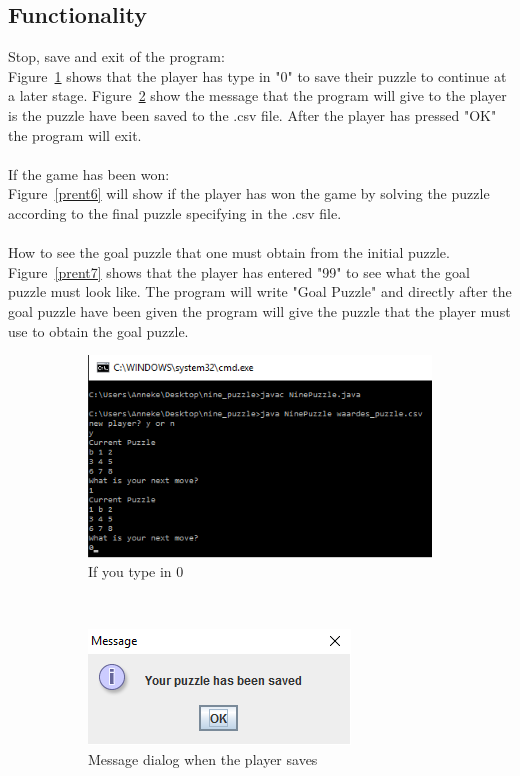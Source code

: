 \documentclass[10pt]{article}
\begin{document}
\subsection{Functionality}
Stop, save and exit of the program:
\\ Figure~\ref{prent4} shows that the player has type in "0" to save their puzzle to continue at a later stage.
Figure~\ref{prent5} show the message that the program will give to the player is the puzzle have been saved to the .csv file.  After the player has pressed "OK" the program will exit.
\\
\\If the game has been won:
\\Figure~\ref{prent6} will show if the player has won the game by solving the puzzle according to the final puzzle specifying in the .csv file.
\\
\\How to see the goal puzzle that one must obtain from the initial puzzle.
\\Figure~\ref{prent7} shows that the player has entered "99" to see what the goal puzzle must look like.  The program will write "Goal Puzzle" and directly after the goal puzzle have been given the program will give the puzzle that the player must use to obtain the goal puzzle.
\begin{figure}
  \centering
  \begin{subfigure}{0.5\textwidth}
    \centering
    \includegraphics[scale=0.8]{./Prente/prent4.png}
    \caption{If you type in 0}
    \label{prent4}
  \end{subfigure}%
 ~
  \begin{subfigure}{0.5\textwidth}
    \centering
    \includegraphics[scale=0.8]{./Prente/prent5.png}
    \caption{Message dialog when the player saves}
    \label{prent5}
  \end{subfigure}
  \caption{\label{2}}
  \end{figure}
  
\end{document}
